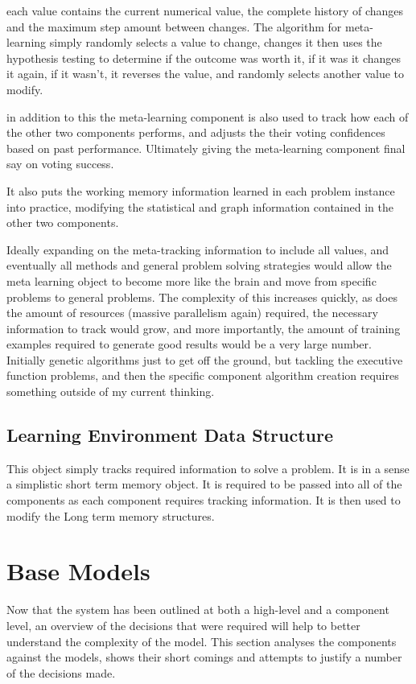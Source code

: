 each value contains the current numerical value, the complete history of changes
and the maximum step amount between changes.  The algorithm for meta-learning
simply randomly selects a value to change, changes it then uses the hypothesis
testing to determine if the outcome was worth it, if it was it changes it again,
if it wasn't, it reverses the value, and randomly selects another value to
modify.

in addition to this the meta-learning component is also used to track how each
of the other two components performs, and adjusts the their voting confidences
based on past performance.  Ultimately giving the meta-learning component final
say on voting success.

It also puts the working memory information learned in each problem instance
into practice, modifying the statistical and graph information contained in the
other two components.

Ideally expanding on the meta-tracking information to include all values, and
eventually all methods and general problem solving strategies would allow the
meta learning object to become more like the brain and move from specific
problems to general problems.  The complexity of this increases quickly, as does
the amount of resources (massive parallelism again) required, the necessary
information to track would grow, and more importantly, the amount of training
examples required to generate good results would be a very large number.
Initially genetic algorithms just to get off the ground, but tackling the
executive function problems, and then the specific component algorithm creation
requires something outside of my current thinking.

\subsection{Learning Environment Data Structure}  

This object simply tracks
required information to solve a problem.  It is in a sense a simplistic short
term memory object.  It is required to be passed into all of the components as
each component requires tracking information.  It is then used to modify the
Long term memory structures.

\section{Base Models}

Now that the system has been outlined at both a high-level and a component
level, an overview of the decisions that were required will help to better
understand the complexity of the model. This section analyses the components
against the models, shows their short comings and attempts to justify a number
of the decisions made.

